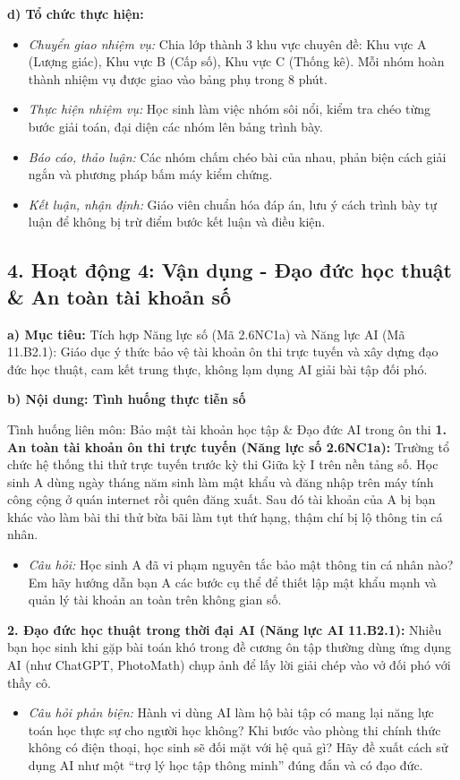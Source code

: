 \documentclass[12pt, a4paper]{article}
\begin{document}
\noindent \textbf{d) Tổ chức thực hiện:}
\begin{itemize}[leftmargin=0.8cm]
    \item \textit{Chuyển giao nhiệm vụ:} Chia lớp thành 3 khu vực chuyên đề: Khu vực A (Lượng giác), Khu vực B (Cấp số), Khu vực C (Thống kê). Mỗi nhóm hoàn thành nhiệm vụ được giao vào bảng phụ trong 8 phút.
    \item \textit{Thực hiện nhiệm vụ:} Học sinh làm việc nhóm sôi nổi, kiểm tra chéo từng bước giải toán, đại diện các nhóm lên bảng trình bày.
    \item \textit{Báo cáo, thảo luận:} Các nhóm chấm chéo bài của nhau, phản biện cách giải ngắn và phương pháp bấm máy kiểm chứng.
    \item \textit{Kết luận, nhận định:} Giáo viên chuẩn hóa đáp án, lưu ý cách trình bày tự luận để không bị trừ điểm bước kết luận và điều kiện.
\end{itemize}

\subsection*{4. Hoạt động 4: Vận dụng - Đạo đức học thuật & An toàn tài khoản số}

\noindent \textbf{a) Mục tiêu:}
Tích hợp Năng lực số (Mã 2.6NC1a) và Năng lực AI (Mã 11.B2.1): Giáo dục ý thức bảo vệ tài khoản ôn thi trực tuyến và xây dựng đạo đức học thuật, cam kết trung thực, không lạm dụng AI giải bài tập đối phó.

\noindent \textbf{b) Nội dung: Tình huống thực tiễn số}
\begin{aibox}{Tình huống liên môn: Bảo mật tài khoản học tập \& Đạo đức AI trong ôn thi}
\textbf{1. An toàn tài khoản ôn thi trực tuyến (Năng lực số 2.6NC1a):}
Trường tổ chức hệ thống thi thử trực tuyến trước kỳ thi Giữa kỳ I trên nền tảng số. Học sinh A dùng ngày tháng năm sinh làm mật khẩu và đăng nhập trên máy tính công cộng ở quán internet rồi quên đăng xuất. Sau đó tài khoản của A bị bạn khác vào làm bài thi thử bừa bãi làm tụt thứ hạng, thậm chí bị lộ thông tin cá nhân.
\begin{itemize}[leftmargin=0.6cm]
    \item \textit{Câu hỏi:} Học sinh A đã vi phạm nguyên tắc bảo mật thông tin cá nhân nào? Em hãy hướng dẫn bạn A các bước cụ thể để thiết lập mật khẩu mạnh và quản lý tài khoản an toàn trên không gian số.
\end{itemize}

\textbf{2. Đạo đức học thuật trong thời đại AI (Năng lực AI 11.B2.1):}
Nhiều bạn học sinh khi gặp bài toán khó trong đề cương ôn tập thường dùng ứng dụng AI (như ChatGPT, PhotoMath) chụp ảnh để lấy lời giải chép vào vở đối phó với thầy cô.
\begin{itemize}[leftmargin=0.6cm]
    \item \textit{Câu hỏi phản biện:} Hành vi dùng AI làm hộ bài tập có mang lại năng lực toán học thực sự cho người học không? Khi bước vào phòng thi chính thức không có điện thoại, học sinh sẽ đối mặt với hệ quả gì? Hãy đề xuất cách sử dụng AI như một ``trợ lý học tập thông minh'' đúng đắn và có đạo đức.
\end{itemize}
\end{aibox}
\end{document}
